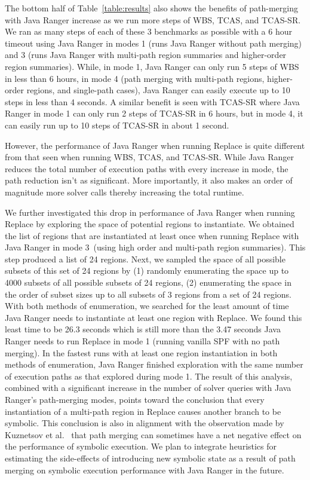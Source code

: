 %
The bottom half of Table~\ref{table:results} also shows the benefits of path-merging with Java Ranger increase as we run
more steps of WBS, TCAS, and TCAS-SR.
%
We ran as many steps of each of these 3 benchmarks as possible with a 6 hour timeout using Java Ranger in modes
1 (runs Java Ranger without path merging) and 3 (runs Java Ranger with multi-path region summaries and higher-order region summaries).
%
While, in mode 1, Java Ranger can only run 5 steps of WBS in less than 6 hours, in mode 4 (path merging with multi-path regions, higher-order regions, and single-path cases),
Java Ranger can easily execute up to 10 steps in less than 4 seconds.
%
A similar benefit is seen with TCAS-SR where Java Ranger in mode 1 can only run 2 steps of TCAS-SR in 6 hours, but in
mode 4, it can easily run up to 10 steps of TCAS-SR in about 1 second.

However, the performance of Java Ranger when running Replace is quite different from that seen when running WBS, TCAS, and TCAS-SR.
%
While Java Ranger reduces the total number of execution paths with every increase in mode, the path reduction isn't as significant.
%
More importantly, it also makes an order of magnitude more solver calls thereby increasing the total runtime.

We further investigated this drop in performance of Java Ranger when running Replace by exploring the space of potential
regions to instantiate.
%
We obtained the list of regions that are instantiated at least once when running Replace with Java Ranger in mode 3~(using
high order and multi-path region summaries).
%
This step produced a list of 24 regions.
%
Next, we sampled the space of all possible subsets of this set of 24 regions by
%
(1) randomly enumerating the space up to 4000 subsets of all possible subsets of 24 regions,
%
(2) enumerating the space in the order of subset sizes up to all subsets of 3 regions from a set of 24 regions.
%
With both methods of enumeration, we searched for the least amount of time Java Ranger needs to instantiate at least one
region with Replace.
%
We found this least time to be 26.3 seconds which is still more than the 3.47 seconds Java Ranger needs to run
Replace in mode 1 (running vanilla SPF with no path merging).
%
In the fastest runs with at least one region instantiation in both methods of enumeration, Java Ranger finished
exploration with the same number of execution paths as that explored during mode 1.
%
The result of this analysis, combined with a significant increase in the number of solver queries with Java Ranger's
path-merging modes, points toward the conclusion that every instantiation of a multi-path region in Replace causes another branch to be
symbolic.
%
This conclusion is also in alignment with the observation made by Kuznetsov et al.~\cite{kuznetsov} that path merging can
sometimes have a net negative effect on the performance of symbolic execution.
%
We plan to integrate heuristics for estimating the side-effects of introducing new symbolic state as a result of
path merging on symbolic execution performance with Java Ranger in the future.
